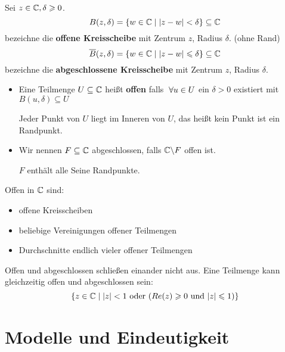 \documentclass[main.tex]{subfiles}
\begin{document}
\begin{Definition}[Kreisscheibe]
  Sei $z\in \mathbb{C}, \delta \geqslant 0$.
  $$B(z,\delta) = \{w\in \mathbb{C} \mid |z-w| < \delta \} \subseteq \mathbb{C}$$
  bezeichne die \textbf{offene Kreisscheibe} mit Zentrum $z$, Radius $\delta$. (ohne Rand)
  $$\overline{B}(z, \delta) = \{w\in \mathbb{C} \mid |z-w| \leqslant \delta \} \subseteq \mathbb{C}$$
  bezeichne die \textbf{abgeschlossene Kreisscheibe} mit Zentrum $z$, Radius $\delta$.
\end{Definition}

\begin{Definition}
  \begin{itemize}
    \item Eine Teilmenge $U \subseteq \mathbb{C}$ heißt \textbf{offen} falls $\;\forall u \in U$ ein $\delta > 0$ existiert mit $B(u,\delta) \subseteq U$
    \begin{Bemerkung}[informell]
      Jeder Punkt von $U$ liegt im Inneren von $U$, das heißt kein Punkt ist ein Randpunkt.
    \end{Bemerkung}
    \item Wir nennen $F \subseteq \mathbb{C}$ abgeschlossen, falls $\mathbb{C} \backslash F$ offen ist.
    \begin{Bemerkung}[informell]
      $F$ enthält alle Seine Randpunkte.
    \end{Bemerkung}
  \end{itemize}
\end{Definition}

\begin{Beispiel}
  Offen in $\mathbb{C}$ sind:
  \begin{itemize}
    \item offene Kreisscheiben
    \item beliebige Vereinigungen offener Teilmengen
    \item Durchschnitte endlich vieler offener Teilmengen
  \end{itemize}
\end{Beispiel}

\begin{Bemerkung}
  Offen und abgeschlossen schließen einander nicht aus. Eine Teilmenge kann gleichzeitig offen und abgeschlossen sein:
  $$\{z\in \mathbb{C} \mid |z| < 1 \text{ oder } (Re(z)\geqslant 0 \text{ und } |z|\leqslant 1)\}$$
\end{Bemerkung}



\section{Modelle und Eindeutigkeit}
\end{document}
